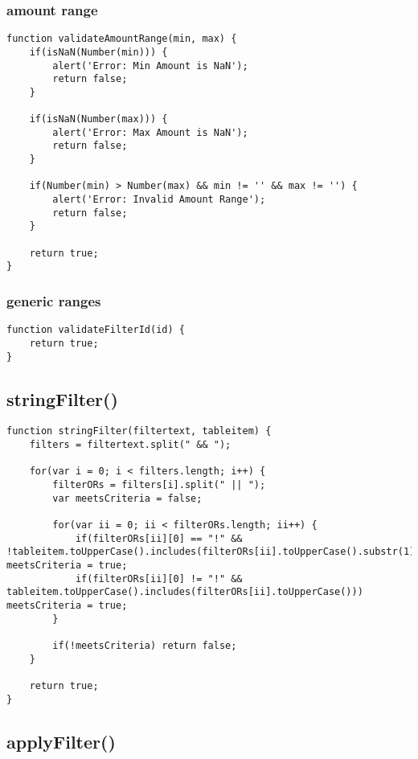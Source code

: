 \documentclass[letterpaper]{article}
\begin{document}
\subsubsection{amount range}

\begin{lstlisting}[firstnumber=437]
function validateAmountRange(min, max) {
    if(isNaN(Number(min))) {
        alert('Error: Min Amount is NaN');
        return false;
    }

    if(isNaN(Number(max))) {
        alert('Error: Max Amount is NaN');
        return false;
    }

    if(Number(min) > Number(max) && min != '' && max != '') {
        alert('Error: Invalid Amount Range');
        return false;
    }

    return true;
}
\end{lstlisting}

\subsubsection{generic ranges}

\begin{lstlisting}[firstnumber=406]
function validateFilterId(id) {
    return true;
}
\end{lstlisting}

\subsection{stringFilter()}

\begin{lstlisting}[firstnumber=494]
function stringFilter(filtertext, tableitem) {
    filters = filtertext.split(" && ");

    for(var i = 0; i < filters.length; i++) {
        filterORs = filters[i].split(" || ");
        var meetsCriteria = false;

        for(var ii = 0; ii < filterORs.length; ii++) {
            if(filterORs[ii][0] == "!" && !tableitem.toUpperCase().includes(filterORs[ii].toUpperCase().substr(1))) meetsCriteria = true;
            if(filterORs[ii][0] != "!" && tableitem.toUpperCase().includes(filterORs[ii].toUpperCase())) meetsCriteria = true;
        }

        if(!meetsCriteria) return false;
    }

    return true;
}
\end{lstlisting}

\subsection{applyFilter()}
\end{document}
